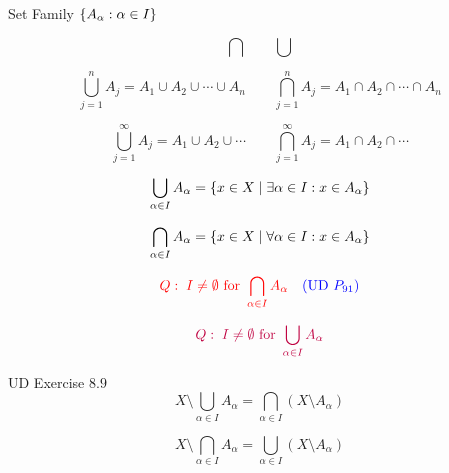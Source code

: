 \begin{frame}{}
  \centerline{\Large Set Family $\{A_{\alpha}: \alpha \in I\}$}

  \[
    \bigcap \qquad \bigcup
  \]
\end{frame}

\begin{frame}{}
    \[
      \bigcup_{j = 1}^{n} A_j = A_1 \cup A_2 \cup \cdots \cup A_n \qquad 
      \bigcap_{j = 1}^{n} A_j = A_1 \cap A_2 \cap \cdots \cap A_n
    \]

    \pause
    \vspace{1.00cm}
    \[
      \bigcup_{j = 1}^{\infty} A_j = A_1 \cup A_2 \cup \cdots \qquad 
      \bigcap_{j = 1}^{\infty} A_j = A_1 \cap A_2 \cap \cdots 
    \]
\end{frame}

\begin{frame}{}
  \[
    \bigcup_{\alpha \in I} A_{\alpha} = \{x \in X \mid \exists \alpha \in I: x \in A_{\alpha}\}
  \]

  \[
    \bigcap_{\alpha \in I} A_{\alpha} = \{x \in X \mid \forall \alpha \in I: x \in A_{\alpha}\}
  \]

  \pause
  \vspace{0.60cm}
  \[
    \textcolor{red}{Q: \; I \neq \emptyset \text{ for } \bigcap_{\alpha \in I} A_{\alpha}} \quad \textcolor{blue}{(\text{UD } P_{91})}
  \]

  \pause
  \vspace{0.60cm}
  \[
    \textcolor{purple}{Q: \; I \neq \emptyset \text{ for } \bigcup_{\alpha \in I} A_{\alpha}}
  \]
\end{frame}

\begin{frame}{}
  \begin{exampleblock}{UD Exercise $8.9$}
    \[
      X \setminus \bigcup_{\alpha \in I} A_{\alpha} = \bigcap_{\alpha \in I} (X \setminus A_{\alpha})
    \]

    \[
      X \setminus \bigcap_{\alpha \in I} A_{\alpha} = \bigcup_{\alpha \in I} (X \setminus A_{\alpha})
    \]
  \end{exampleblock}
\end{frame}

